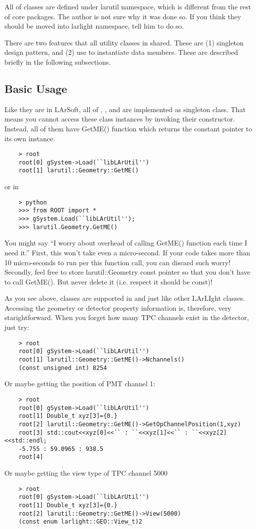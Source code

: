 All of \LArUtil classes are defined under {\ttfamily larutil} namespace, which is different from the rest of core packages. The author is not sure why it was done so. If you think they should be moved into {\ttfamily larlight} namespace, tell him to do so.

There are two features that all utility classes in \LArUtil shared. These are (1) singleton design pattern, and (2) use  to instantiate data members. These are described briefly in the following subsections.

\subsection{Basic Usage}
Like they are in LArSoft, all of \Geometry, \LArProperties, and \DetectorProperties are implemented as singleton class. That means you cannot access these class instances by invoking their constructor. Instead, all of them have {\ttfamily GetME()} function which returns the constant pointer to its own instance.
\begin{lstlisting}
    > root
    root[0] gSystem->Load(``libLArUtil'')
    root[1] larutil::Geometry::GetME()
\end{lstlisting}
or in \PyROOT
\begin{lstlisting}
    > python
    >>> from ROOT import *
    >>> gSystem.Load(``libLArUtil'');
    >>> larutil.Geometry.GetME()
\end{lstlisting}
You might say ``I worry about overhead of calling {\ttfamily GetME()} function each time I need it.'' First, this won't take even a micro-second. If your code takes more than 10 micro-seconds to run per this function call, you can discard such worry! Secondly, feel free to store {\ttfamily larutil::Geometry} const pointer so that you don't have to call {\ttfamily GetME()}. But never delete it (i.e. respect it should be const)! 

As you see above, \LArUtil classes are supported in \CINT and \PyROOT just like other LArLIght classes. Accessing the geometry or detector property information is, therefore, very starightforward. When you forget how many TPC channels exist in the detector, just try:
\begin{lstlisting}
    > root
    root[0] gSystem->Load(``libLArUtil'')
    root[1] larutil::Geometry::GetME()->Nchannels()
    (const unsigned int) 8254
\end{lstlisting}
Or maybe getting the position of PMT channel 1:
\begin{lstlisting}
    > root
    root[0] gSystem->Load(``libLArUtil'')
    root[1] Double_t xyz[3]={0.}
    root[2] larutil::Geometry::GetME()->GetOpChannelPosition(1,xyz)
    root[3] std::cout<<xyz[0]<<`` : ``<<xyz[1]<<`` : ``<<xyz[2]<<std::endl;
    -5.755 : 59.0965 : 938.5
    root[4] 
\end{lstlisting}
Or maybe getting the view type of TPC channel 5000
\begin{lstlisting}
    > root
    root[0] gSystem->Load(``libLArUtil'')
    root[1] Double_t xyz[3]={0.}
    root[2] larutil::Geometry::GetME()->View(5000)
    (const enum larlight::GEO::View_t)2
\end{lstlisting}

